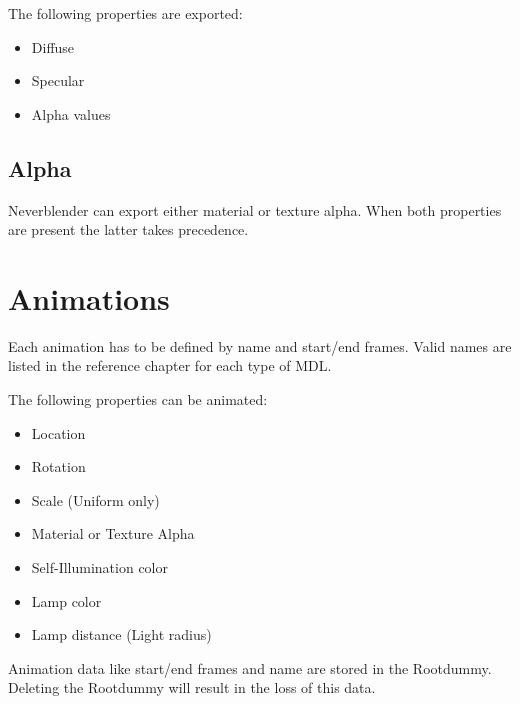 The following properties are exported:
\begin{itemize}
    \item Diffuse
    \item Specular
    \item Alpha values
\end{itemize}

\subsection*{Alpha}
Neverblender can export either material or texture alpha. When both properties are present 
the latter takes precedence.

\section{Animations}
Each animation has to be defined by name and start/end frames. Valid names 
are listed in the reference chapter for each type of MDL.

The following properties can be animated:
\begin{itemize}
    \item Location
    \item Rotation
    \item Scale (Uniform only)
    \item Material or Texture Alpha
    \item Self-Illumination color
    \item Lamp color
    \item Lamp distance (Light radius)
\end{itemize}
Animation data like start/end frames and name are stored in the Rootdummy. Deleting the Rootdummy will result in
the loss of this data.